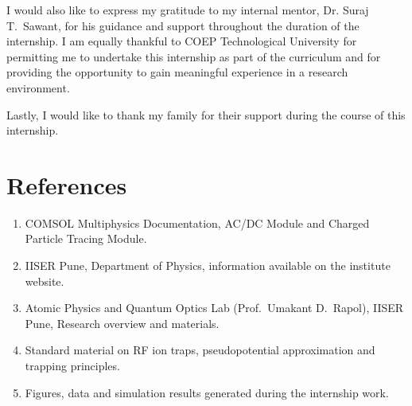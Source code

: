 \documentclass[12pt,a4paper]{report}
\begin{document}
I would also like to express my gratitude to my internal mentor, Dr. Suraj T.\ Sawant, for his guidance and support throughout the duration of the internship. I am equally thankful to COEP Technological University for permitting me to undertake this internship as part of the curriculum and for providing the opportunity to gain meaningful experience in a research environment.

Lastly, I would like to thank my family for their support during the course of this internship.

\chapter*{References}

\begin{enumerate}
    \item COMSOL Multiphysics Documentation, AC/DC Module and Charged Particle Tracing Module.
    \item IISER Pune, Department of Physics, information available on the institute website.
    \item Atomic Physics and Quantum Optics Lab (Prof.\ Umakant D.\ Rapol), IISER Pune, Research overview and materials.
    \item Standard material on RF ion traps, pseudopotential approximation and trapping principles.
    \item Figures, data and simulation results generated during the internship work.
\end{enumerate}
\end{document}
